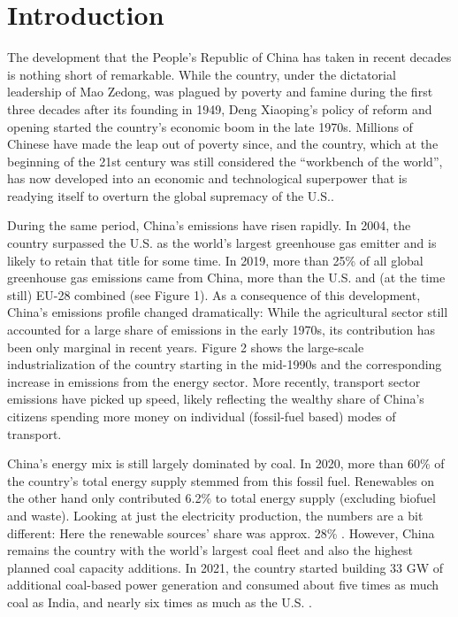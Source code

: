 \documentclass[
  12pt,
]{article}
\numberwithin{equation}{section}
\numberwithin{table}{section}
\numberwithin{figure}{section}
\begin{document}
\hypertarget{introduction}{%
\section{Introduction}\label{introduction}}

The development that the People's Republic of China has taken in recent
decades is nothing short of remarkable. While the country, under the
dictatorial leadership of Mao Zedong, was plagued by poverty and famine
during the first three decades after its founding in 1949, Deng
Xiaoping's policy of reform and opening started the country's economic
boom in the late 1970s. Millions of Chinese have made the leap out of
poverty since, and the country, which at the beginning of the 21st
century was still considered the ``workbench of the world'', has now
developed into an economic and technological superpower that is readying
itself to overturn the global supremacy of the U.S..

During the same period, China's emissions have risen rapidly. In 2004,
the country surpassed the U.S. as the world's largest greenhouse gas
emitter and is likely to retain that title for some time. In 2019, more
than 25\% of all global greenhouse gas emissions came from China, more
than the U.S. and (at the time still) EU-28 combined (see Figure 1). As
a consequence of this development, China's emissions profile changed
dramatically: While the agricultural sector still accounted for a large
share of emissions in the early 1970s, its contribution has been only
marginal in recent years. Figure 2 shows the large-scale
industrialization of the country starting in the mid-1990s and the
corresponding increase in emissions from the energy sector. More
recently, transport sector emissions have picked up speed, likely
reflecting the wealthy share of China's citizens spending more money on
individual (fossil-fuel based) modes of transport.

China's energy mix is still largely dominated by coal. In 2020, more
than 60\% of the country's total energy supply stemmed from this fossil
fuel. Renewables on the other hand only contributed 6.2\% to total
energy supply (excluding biofuel and waste). Looking at just the
electricity production, the numbers are a bit different: Here the
renewable sources' share was approx. 28\% \citep{IEA2022}. However,
China remains the country with the world's largest coal fleet and also
the highest planned coal capacity additions. In 2021, the country
started building 33 GW of additional coal-based power generation and
consumed about five times as much coal as India, and nearly six times as
much as the U.S. \citep{Green2022}.
\end{document}
